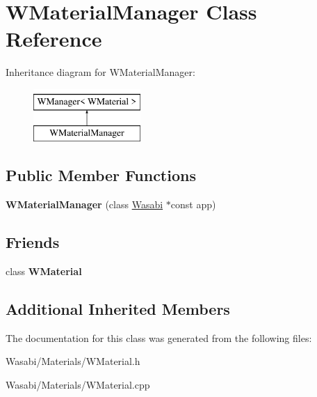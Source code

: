 \hypertarget{class_w_material_manager}{}\section{W\+Material\+Manager Class Reference}
\label{class_w_material_manager}
Inheritance diagram for W\+Material\+Manager\+:\begin{figure}[H]
\begin{center}
\leavevmode
\includegraphics[height=2.000000cm]{class_w_material_manager}
\end{center}
\end{figure}
\subsection*{Public Member Functions}
\begin{DoxyCompactItemize}
\item 
{\bfseries W\+Material\+Manager} (class \hyperlink{class_wasabi}{Wasabi} $\ast$const app)\hypertarget{class_w_material_manager_a0fd1d6202eadb0619c2790374f78d22c}{}\label{class_w_material_manager_a0fd1d6202eadb0619c2790374f78d22c}

\end{DoxyCompactItemize}
\subsection*{Friends}
\begin{DoxyCompactItemize}
\item 
class {\bfseries W\+Material}\hypertarget{class_w_material_manager_a82829be2ace0f839dd132dface8a4da3}{}\label{class_w_material_manager_a82829be2ace0f839dd132dface8a4da3}

\end{DoxyCompactItemize}
\subsection*{Additional Inherited Members}


The documentation for this class was generated from the following files\+:\begin{DoxyCompactItemize}
\item 
Wasabi/\+Materials/W\+Material.\+h\item 
Wasabi/\+Materials/W\+Material.\+cpp\end{DoxyCompactItemize}
